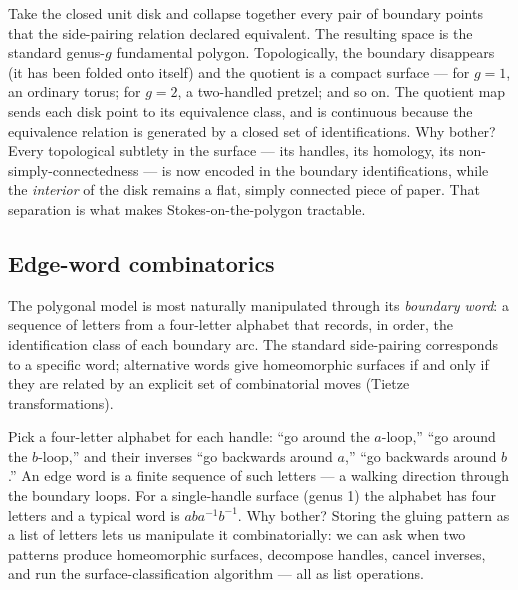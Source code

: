 \begin{layman}
Take the closed unit disk and collapse together every pair of
boundary points that the side-pairing relation declared equivalent.
The resulting space is the standard genus-\(g\) fundamental polygon.
Topologically, the boundary disappears (it has been folded onto
itself) and the quotient is a compact surface --- for \(g=1\), an
ordinary torus; for \(g=2\), a two-handled pretzel; and so on. The
quotient map sends each disk point to its equivalence class, and is
continuous because the equivalence relation is generated by a closed
set of identifications. Why bother? Every topological subtlety in
the surface --- its handles, its homology, its non-simply-connectedness
--- is now encoded in the boundary identifications, while the
\emph{interior} of the disk remains a flat, simply connected piece
of paper. That separation is what makes Stokes-on-the-polygon
tractable.
\end{layman}

\subsection{Edge-word combinatorics}

The polygonal model is most naturally manipulated through its
\emph{boundary word}: a sequence of letters from a four-letter
alphabet that records, in order, the identification class of each
boundary arc. The standard side-pairing corresponds to a specific
word; alternative words give homeomorphic surfaces if and only if
they are related by an explicit set of combinatorial moves (Tietze
transformations).



\begin{layman}
Pick a four-letter alphabet for each handle: ``go around the
\(a\)-loop,'' ``go around the \(b\)-loop,'' and their inverses ``go
backwards around \(a\),'' ``go backwards around \(b\).'' An edge
word is a finite sequence of such letters --- a walking direction
through the boundary loops. For a single-handle surface (genus 1)
the alphabet has four letters and a typical word is \(aba^{-1}b^{-1}\).
Why bother? Storing the gluing pattern as a list of letters lets us
manipulate it combinatorially: we can ask when two patterns produce
homeomorphic surfaces, decompose handles, cancel inverses, and run
the surface-classification algorithm --- all as list operations.
\end{layman}



